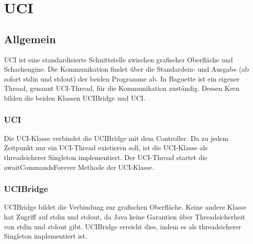 
\section{UCI}\label{sec:uci}
\subsection{Allgemein}\label{subsec:allgemein}
UCI ist eine standardisierte Schnittstelle zwischen grafischer Oberfl\"ache und Schachengine.
Die Kommunikation findet \"uber die Standardein- und Ausgabe (ab sofort stdin und stdout) der beiden Programme ab.\cite[l. 9]{uci}
\newline
In Baguette ist ein eigener Thread, genannt UCI-Thread, f\"ur die Kommunikation zust\"andig.
Dessen Kern bilden die beiden Klassen UCIBridge und UCI\@.

\subsubsection{UCI}
Die UCI-Klasse verbindet die UCIBridge mit dem Controller.
Da zu jedem Zeitpunkt nur ein UCI-Thread existieren soll, ist die UCI-Klasse als threadsicherer Singleton implementiert.
Der UCI-Thread startet die awaitCommandsForever Methode der UCI-Klasse.

\subsubsection{UCIBridge}
UCIBridge bildet die Verbindung zur grafischen Oberfl\"ache.
Keine andere Klasse hat Zugriff auf stdin und stdout, da Java keine Garantien \"uber Threadsicherheit von stdin und stdout gibt.
UCIBridge erreicht dies, indem es als threadsicherer Singleton implementiert ist.
\pagebreak